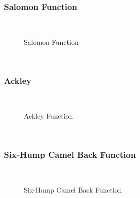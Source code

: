 \subsubsection{Salomon Function}
~
\begin{figure}[ht]
	\centering
	\setlength \fboxsep{0pt}
	\setlength \fboxrule{0.5pt}
	\caption{Salomon Function}
	\label{fig:SalomonGraph}
\end{figure}
~
\subsubsection{Ackley}
~
\begin{figure}[ht]
	\centering
	\setlength \fboxsep{0pt}
	\setlength \fboxrule{0.5pt}
	\caption{Ackley Function}
	\label{fig:AckleyGraph}
\end{figure}
~
\subsubsection{Six-Hump Camel Back Function}
~
\begin{figure}[ht]
	\centering
	\setlength \fboxsep{0pt}
	\setlength \fboxrule{0.5pt}
	\caption{Six-Hump Camel Back Function}
	\label{fig:CamelGraph}
\end{figure}
~

